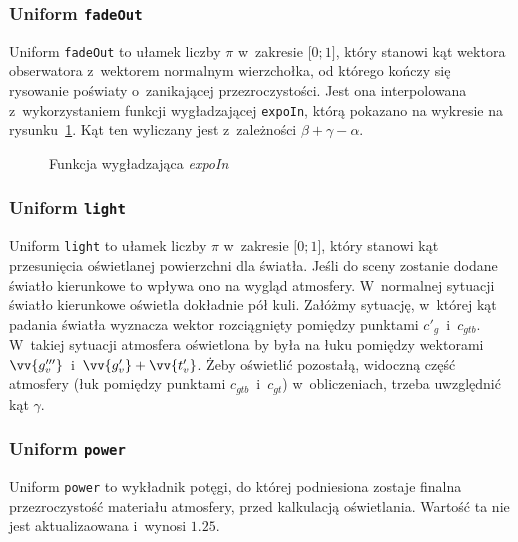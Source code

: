 \subsubsection{Uniform \texttt{fadeOut}}
Uniform \texttt{fadeOut} to ułamek liczby $\pi$ w~zakresie $\lbrack0; 1\rbrack$, który stanowi kąt wektora obserwatora z~wektorem normalnym wierzchołka, od którego kończy się rysowanie poświaty o~zanikającej przezroczystości. Jest ona interpolowana z~wykorzystaniem funkcji wygładzającej \texttt{expoIn}, którą pokazano na wykresie na rysunku~\ref{fig:c4_expoIn}. Kąt ten wyliczany jest z~zależności $\beta+\gamma-\alpha$.
\begin{figure}[h]
  \centering
  \caption{Funkcja wygładzająca \textit{expoIn}}
  \label{fig:c4_expoIn}
\end{figure}
\subsubsection{Uniform \texttt{light}}
Uniform \texttt{light} to ułamek liczby $\pi$ w~zakresie $\lbrack0; 1\rbrack$, który stanowi kąt przesunięcia oświetlanej powierzchni dla światła. Jeśli do sceny zostanie dodane światło kierunkowe to wpływa ono na wygląd atmosfery. W~normalnej sytuacji światło kierunkowe oświetla dokładnie pół kuli. Załóżmy sytuację, w~której kąt padania światła wyznacza wektor rozciągnięty pomiędzy punktami $c'_g$~i~$c_{gtb}$. W~takiej sytuacji atmosfera oświetlona by była na łuku pomiędzy wektorami $\vv {g'''_v}$~i~$\vv {g'_v} + \vv{t'_v}$. Żeby oświetlić pozostałą, widoczną część atmosfery (łuk pomiędzy punktami $c_{gtb}$~i~$c_{gt}$) w~obliczeniach, trzeba uwzględnić kąt $\gamma$.

\subsubsection{Uniform \texttt{power}}
Uniform \texttt{power} to wykładnik potęgi, do której podniesiona zostaje finalna przezroczystość materiału atmosfery, przed kalkulacją oświetlania. Wartość ta nie jest aktualizaowana i~wynosi $1.25$.

